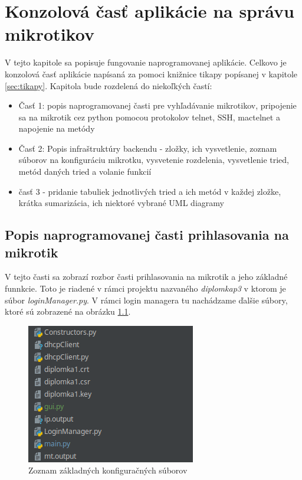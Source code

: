 \chapter{Konzolová časť aplikácie na správu mikrotikov}
V tejto kapitole sa popisuje fungovanie naprogramovanej aplikácie. Celkovo je konzolová časť aplikácie napísaná za pomoci knižnice tikapy popísanej v kapitole \ref{sec:tikapy}. Kapitola bude rozdelená do niekoľkých častí:\begin{itemize}
\item Časť 1: popis naprogramovanej časti pre vyhľadávanie mikrotikov, pripojenie sa na mikrotik cez python pomocou protokolov telnet, SSH, mactelnet a napojenie na metódy
\item Časť 2: Popis infraštruktúry backendu - zložky, ich vysvetlenie, zoznam súborov na konfiguráciu mikrotku, vysvetenie rozdelenia, vysvetlenie tried, metód daných tried a volanie funkcií
\item časť 3 - pridanie tabuliek jednotlivých tried a ich metód v každej zložke, krátka sumarizácia, ich niektoré vybrané UML diagramy
\end{itemize}
\section{Popis naprogramovanej časti prihlasovania na mikrotik}
\label{sec:popis1}
V tejto časti sa zobrazí rozbor časti prihlasovania na mikrotik a jeho základné funnkcie. Toto je riadené v rámci projektu nazvaného \textit{diplomkap3} v ktorom je súbor \textit{loginManager.py}. V rámci login managera tu nachádzame ďalšie súbory, ktoré sú zobrazené na obrázku \ref{fig:filesLogin}. 
\begin{figure}[H]
\centering
\includegraphics[scale=0.6]{../text/loginFiles.png}
\caption{Zoznam základných konfiguračných súborov}
\label{fig:filesLogin}
\end{figure} 
